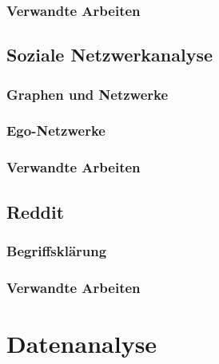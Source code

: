 \documentclass[11pt,a4paper,twoside]{article}
\begin{document}
\hypertarget{verwandte-arbeiten}{%
\subsubsection{Verwandte Arbeiten}\label{verwandte-arbeiten}}

\hypertarget{soziale-netzwerkanalyse}{%
\subsection{Soziale Netzwerkanalyse}\label{soziale-netzwerkanalyse}}

\hypertarget{graphen-und-netzwerke}{%
\subsubsection{Graphen und Netzwerke}\label{graphen-und-netzwerke}}

\hypertarget{ego-netzwerke}{%
\subsubsection{Ego-Netzwerke}\label{ego-netzwerke}}

\hypertarget{verwandte-arbeiten-1}{%
\subsubsection{Verwandte Arbeiten}\label{verwandte-arbeiten-1}}

\hypertarget{reddit}{%
\subsection{Reddit}\label{reddit}}

\hypertarget{begriffsklarung}{%
\subsubsection{Begriffsklärung}\label{begriffsklarung}}

\hypertarget{verwandte-arbeiten-2}{%
\subsubsection{Verwandte Arbeiten}\label{verwandte-arbeiten-2}}

\cleardoublepage

\hypertarget{datenanalyse}{%
\section{Datenanalyse}\label{datenanalyse}}
\end{document}

